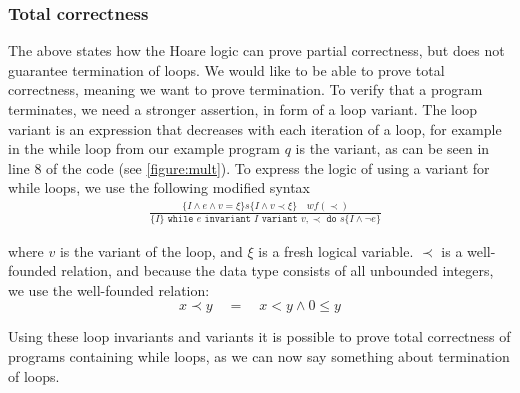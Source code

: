 \subsubsection{Total correctness}\label{sec:total-correctness}
The above states how the Hoare logic can prove partial correctness, but does not guarantee termination of loops. 
We would like to be able to prove total correctness, meaning we want to prove termination. 
To verify that a program terminates, we need a stronger assertion, in form of a loop variant.
The loop variant is an expression that decreases with each iteration of a loop, for example in the while loop from our example program $q$ is the variant, as can be seen in line 8 of the code (see \cref{figure:mult}).
To express the logic of using a variant for while loops, we use the following modified syntax
\begin{equation}\label{eq:totalwhile}
\begin{align*}
  &\frac{
    \{I \land e \land v = \xi \} s \{I \land v \prec \xi \} \quad wf(\prec)
  }{
    \{I\} \texttt{ while } e \texttt{ invariant } I 
          \texttt{ variant } v, \prec \texttt{ do } s \{I \land \neg e\}
  }
\end{align*}
\end{equation}

where $v$ is the variant of the loop, and $\xi$ is a fresh logical variable. $\prec$ is a well-founded relation, and because the data type consists of all unbounded integers, we use the well-founded relation\cite{wlp}:
$$x \prec y \quad = \quad x < y \land 0 \leq y $$

Using these loop invariants and variants it is possible to prove total correctness of programs containing while loops, as we can now say something about termination of loops.
